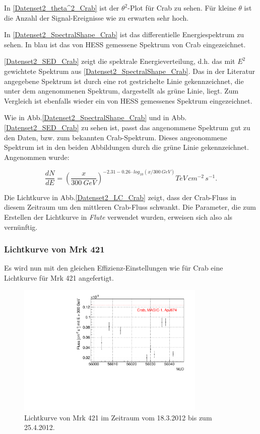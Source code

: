 In \autoref{Datenset2_theta^2_Crab} ist der $\theta^2$-Plot für Crab zu sehen. Für kleine $\theta$ ist die Anzahl der Signal-Ereignisse wie zu erwarten sehr hoch.

In \autoref{Datenset2_SpectralShape_Crab} ist das differentielle Energiespektrum zu sehen.
In blau ist das von HESS gemessene Spektrum von Crab eingezeichnet.

\autoref{Datenset2_SED_Crab} zeigt die spektrale Energieverteilung, d.h. das mit $E^2$ gewichtete Spektrum aus \autoref{Datenset2_SpectralShape_Crab}.
Das in der Literatur angegebene Spektrum ist durch eine rot gestrichelte Linie gekennzeichnet, die unter dem angenommenen Spektrum, dargestellt als grüne Linie, liegt.
Zum Vergleich ist ebenfalls wieder ein von HESS gemessenes Spektrum eingezeichnet.

Wie in Abb.\ref{Datenset2_SpectralShape_Crab} und in Abb.\ref{Datenset2_SED_Crab} zu sehen ist, passt das angenommene Spektrum gut zu den Daten, bzw. zum bekannten Crab-Spektrum.
Dieses angeonommene Spektrum ist in den beiden Abbildungen durch die grüne Linie gekennzeichnet.
Angenommen wurde:

\begin{equation}
\frac{dN}{dE}=\left(\frac{x}{\SI{300}{GeV}}\right)^{-2.31-0.26\cdot log_{10}(x/\SI{300}{GeV})}\si{TeV\,cm^{-2}\,s^{-1}}.
\end{equation}

Die Lichtkurve in Abb.\ref{Datenset2_LC_Crab} zeigt, dass der Crab-Fluss in diesem Zeitraum um den mittleren Crab-Fluss schwankt.
Die Parameter, die zum Erstellen der Lichtkurve in \textit{Flute} verwendet wurden, erweisen sich also als vernünftig.

\subsubsection{Lichtkurve von Mrk 421}
Es wird nun mit den gleichen Effizienz-Einstellungen wie für Crab eine Lichtkurve für Mrk 421 angefertigt.

\begin{figure}
    \centering
    \includegraphics[width=0.8\textwidth]{./Plots/04_MrkAnalyse/Datenset2/LC_Mrk421.pdf}
    \caption{Lichtkurve von Mrk 421 im Zeitraum vom 18.3.2012 bis zum 25.4.2012.}
    \label{Datenset2_LC_Mrk421}
\end{figure}

